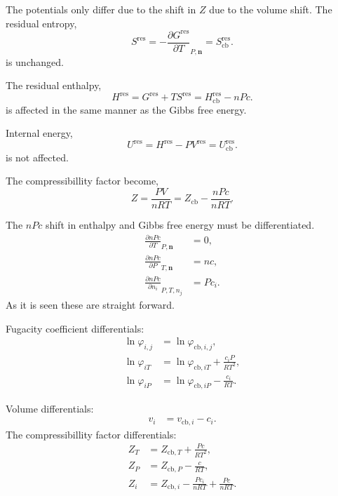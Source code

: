 \documentclass[english]{article}
\newcommand{\pone}[3]{\frac{\partial #1}{\partial #2}_{#3}}%
\newcommand*{\vektor}[1]{\boldsymbol{#1}}%
\newcommand{\cubic}{\text{cb}}
\newcommand{\resid}{\text{res}}
\begin{document}
The potentials only differ due to the shift in $Z$ due to the volume shift. 
The residual entropy, 
\begin{equation}
  S^\resid = -\pone{G^\resid}{T}{P,\vektor{n}} = S^\resid_\cubic .
\label{eq:S}
\end{equation}
is unchanged. 

The residual enthalpy,
\begin{equation}
  H^\resid = G^\resid + T S^\resid = H^\resid_\cubic -  nPc.
\label{eq:H}
\end{equation}
is affected in the same manner as the Gibbs free energy.

Internal energy,
\begin{equation}
  U^\resid = H^\resid - P V^\resid = U^\resid_\cubic.
\label{eq:U}
\end{equation}
is not affected.

The compressibillity factor become,
\begin{equation}
  Z = \frac{PV}{nRT} = Z_\cubic - \frac{nPc}{nRT}.
\label{eq:Z}
\end{equation}

The $nPc$ shift in enthalpy and Gibbs free energy must be
differentiated.
\begin{align}
  \pone{nPc}{T}{P,\vektor{n}} &= 0,\\ 
  \pone{nPc}{P}{T,\vektor{n}} &= nc,\\
  \pone{nPc}{n_i}{P,T,n_j} &= P c_i .
\label{eq:nPcdiff}
\end{align}
As it is seen these are straight forward.

Fugacity coefficient differentials:
\begin{align}
  \ln \varphi_{i,j} & = \ln \varphi_{\cubic,i,j},\\
  \ln \varphi_{iT} &= \ln \varphi_{\cubic,iT} + \frac{c_i P}{R T^2},\\
  \ln \varphi_{iP} &= \ln \varphi_{\cubic,iP} - \frac{c_i}{R T}.
\label{eq:fugdiff}
\end{align}

Volume differentials:
\begin{align}
  v_{i} & = v_{\cubic,i} - c_i.
\label{eq:voldiff}
\end{align}
The compressibillity factor differentials:
\begin{align}
  Z_{T} &= Z_{\cubic,T} + \frac{Pc}{RT^2},\\
  Z_{P} &= Z_{\cubic,P} - \frac{c}{RT},\\
  Z_{i} &= Z_{\cubic,i} - \frac{Pc_i}{nRT} + \frac{Pc}{nRT}.
\label{eq:Zdiff}
\end{align}
\end{document}

